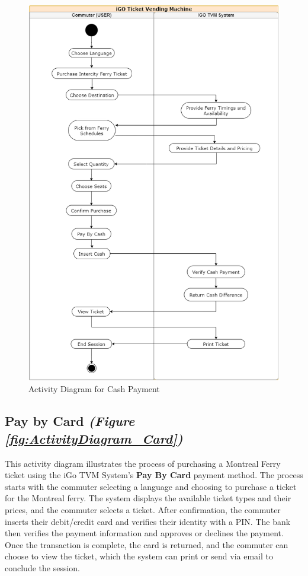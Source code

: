 \documentclass[letterpaper]{report}
\begin{document}
 \begin{figure}[ht]
 \centering
    \includegraphics[width=\textwidth, height=0.95\textheight, keepaspectratio]{ActivityDiagrams/AD - 3.png}
    \caption{Activity Diagram for Cash Payment}
    \label{fig:ActivityDiagram_Cash}
\end{figure}
\clearpage

 \subsection{Pay by Card \emph{(Figure \ref{fig:ActivityDiagram_Card})}}
This activity diagram illustrates the process of purchasing a Montreal Ferry ticket using the iGo TVM System's {\bf Pay By Card} payment method. The process starts with the commuter selecting a language and choosing to purchase a ticket for the Montreal ferry. The system displays the available ticket types and their prices, and the commuter selects a ticket. After confirmation, the commuter inserts their debit/credit card and verifies their identity with a PIN. The bank then verifies the payment information and approves or declines the payment. Once the transaction is complete, the card is returned, and the commuter can choose to view the ticket, which the system can print or send via email to conclude the session.
\vspace{\baselineskip}
\end{document}
